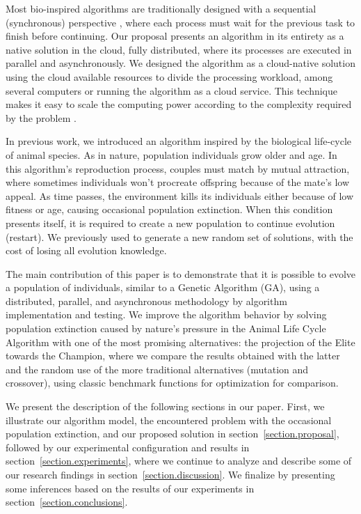 \documentclass[graybox]{svmult}
\begin{document}
Most bio-inspired algorithms are traditionally designed with a sequential
(synchronous) perspective \cite{porto2018evolutionary,back1996evolutionary},
where each process must wait for the previous task to finish before continuing.
Our proposal presents an algorithm in its entirety as a native solution in the
cloud, fully distributed, where its processes are executed in parallel and
asynchronously. We designed the algorithm as a cloud-native solution using the
cloud available resources to divide the processing workload, among several
computers or running the algorithm as a cloud service. This technique makes it
easy to scale the computing power according to the complexity required by the
problem \cite{armbrust2010view}.

In previous work, we introduced an algorithm inspired by the biological
life-cycle of animal species. As in nature, population individuals grow older
and age. In this algorithm's reproduction process, couples must match by mutual
attraction, where sometimes individuals won't procreate offspring because of
the mate's low appeal. As time passes, the environment kills its individuals
either because of low fitness or age, causing occasional population extinction.
When this condition presents itself, it is required to create a new population
to continue evolution (restart). We previously used to generate a new random
set of solutions, with the cost of losing all evolution knowledge.

The main contribution of this paper is to demonstrate that it is possible to
evolve a population of individuals, similar to a Genetic Algorithm (GA), using
a distributed, parallel, and asynchronous methodology by algorithm
implementation and testing. We improve the algorithm behavior by solving
population extinction caused by nature's pressure in the Animal Life Cycle
Algorithm with one of the most promising alternatives: the projection of the
Elite towards the Champion, where we compare the results obtained with the
latter and the random use of the more traditional alternatives (mutation and
crossover), using classic benchmark functions for optimization for comparison.

We present the description of the following sections in our paper. First, we
illustrate our algorithm model, the encountered problem with the occasional
population extinction, and our proposed solution in
section~\ref{section.proposal}, followed by our experimental configuration and
results in section~\ref{section.experiments}, where we continue to analyze and
describe some of our research findings in section~\ref{section.discussion}. We
finalize by presenting some inferences based on the results of our experiments
in section~\ref{section.conclusions}.
\end{document}
